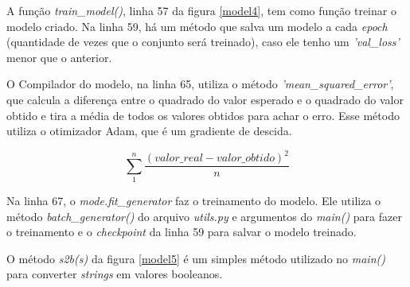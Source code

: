 A função \textit{train\_model()}, linha 57 da figura \ref{model4}, tem como função treinar o modelo criado. Na linha 59, há um método que salva um modelo a cada \textit{epoch} (quantidade de vezes que o conjunto será treinado), caso ele tenho um \textit{'val\_loss'} menor que o anterior.

O Compilador do modelo, na linha 65, utiliza o método \textit{'mean\_squared\_error'}, que calcula a diferença entre o quadrado do valor esperado e o quadrado do valor obtido e tira a média de todos os valores obtidos para achar o erro. Esse método utiliza o otimizador Adam, que é um gradiente de descida.

\[\sum_{1}^{n}\frac{(valor\_real - valor\_obtido)^{2}}{n}\]

Na linha 67, o \textit{mode.fit\_generator} faz o treinamento do modelo. Ele utiliza o método \textit{batch\_generator()} do arquivo \textit{utils.py} e argumentos do \textit{main()} para fazer o treinamento e o \textit{checkpoint} da linha 59 para salvar o modelo treinado.

	\begin{figure}[H]
		\centering
\end{figure}

O método \textit{s2b(s)} da figura \ref{model5} é um simples método utilizado no \textit{main()} para converter \textit{strings} em valores booleanos.

	\begin{figure}[H]
		\centering
\end{figure}

